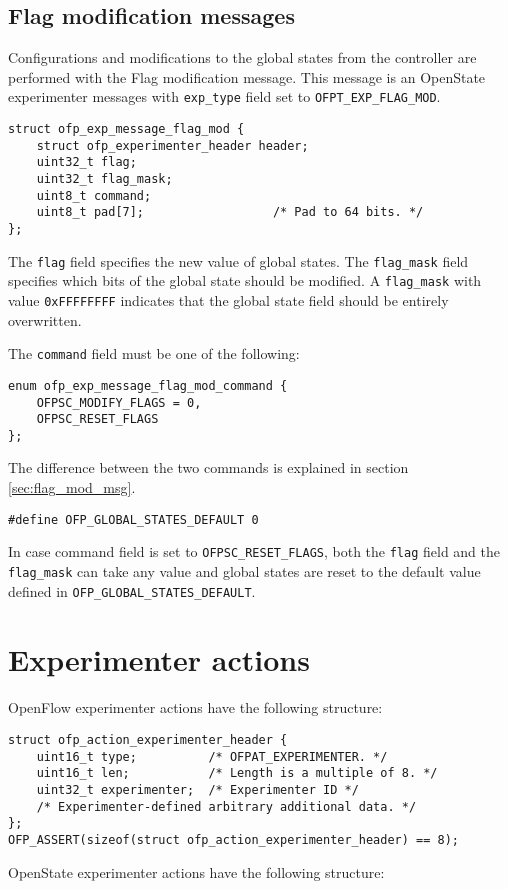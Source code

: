\subsection{Flag modification messages}
\label{sec:flag_mod_msg_proto}
Configurations and modifications to the global states from the controller are performed with the Flag modification message.
This message is an OpenState experimenter messages with \texttt{exp\_type} field set to \texttt{OFPT\_EXP\_FLAG\_MOD}.

\begin{verbatim}
struct ofp_exp_message_flag_mod {
    struct ofp_experimenter_header header; 
    uint32_t flag;
    uint32_t flag_mask;
    uint8_t command;
    uint8_t pad[7];                  /* Pad to 64 bits. */
};
\end{verbatim}
The \texttt{flag} field specifies the new value of global states. The \texttt{flag\_mask} field specifies which bits of the global state should be modified. A \texttt{flag\_mask} with value \texttt{0xFFFFFFFF} indicates that the global state field should be entirely overwritten.

The \texttt{command} field must be one of the following:

\begin{verbatim}
enum ofp_exp_message_flag_mod_command { 
    OFPSC_MODIFY_FLAGS = 0,
    OFPSC_RESET_FLAGS
};
\end{verbatim}

The difference between the two commands is explained in section \ref{sec:flag_mod_msg}.

\begin{verbatim}
#define OFP_GLOBAL_STATES_DEFAULT 0
\end{verbatim}
In case command field is set to \texttt{OFPSC\_RESET\_FLAGS}, both the \texttt{flag} field and the \texttt{flag\_mask} can take any value and global states are reset to the default value defined in \texttt{OFP\_GLOBAL\_STATES\_DEFAULT}.


\section{Experimenter actions}

OpenFlow experimenter actions have the following structure:

\begin{verbatim}
struct ofp_action_experimenter_header {
    uint16_t type;          /* OFPAT_EXPERIMENTER. */
    uint16_t len;           /* Length is a multiple of 8. */
    uint32_t experimenter;  /* Experimenter ID */
    /* Experimenter-defined arbitrary additional data. */
};
OFP_ASSERT(sizeof(struct ofp_action_experimenter_header) == 8);
\end{verbatim}
OpenState experimenter actions have the following structure:

